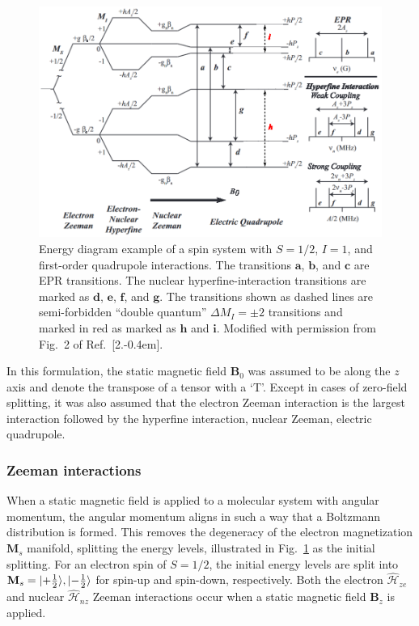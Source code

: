 \begin{figure}[ht]
 \centering
 \includegraphics[width=\textwidth]{Kapitel/Ch2-Images/EnergyDiagram.eps}
 \caption[Energy diagram example with S=1/2 and I=1.]{Energy diagram example of a spin system with $S=1/2$, $I=1$, and first-order quadrupole interactions. The transitions $\mathbf{a}$, $\mathbf{b}$, and $\mathbf{c}$ are EPR transitions. The nuclear hyperfine-interaction transitions are marked as $\mathbf{d}$, $\mathbf{e}$, $\mathbf{f}$, and $\mathbf{g}$. The transitions shown as dashed lines are semi-forbidden ``double quantum'' $\Delta M_I = \pm 2$ transitions and marked in red as marked as $\mathbf{h}$ and $\mathbf{i}$. Modified with permission from Fig.~2 of Ref.~[2.\kern-0.4em].}
 \label{fig:EPREnergy}
\end{figure}

In this formulation, the static magnetic field $\mathbf{B}_0$ was assumed to be along the $z$ axis and denote the transpose of a tensor with a `T'. Except in cases of zero-field splitting, it was also assumed that the electron Zeeman interaction is the largest interaction followed by the hyperfine interaction, nuclear Zeeman, electric quadrupole.

\subsubsection*{Zeeman interactions}
When a static magnetic field is applied to a molecular system with angular momentum, the angular momentum aligns in such a way that a Boltzmann distribution is formed. This removes the degeneracy of the electron magnetization $\mathbf{M}_s$ manifold, splitting the energy levels, illustrated in Fig.~\ref{fig:EPREnergy} as the initial splitting. For an electron spin of $S = 1/2$, the initial energy levels are split into $\mathbf{M}_s = \lvert+\frac{1}{2}\rangle, \lvert-\frac{1}{2}\rangle$ for spin-up and spin-down, respectively. Both the electron $\hat{\mathcal{H}}_{ze}$ and nuclear $\hat{\mathcal{H}}_{nz}$ Zeeman interactions occur when a static magnetic field $\mathbf{B}_z$ is applied.

